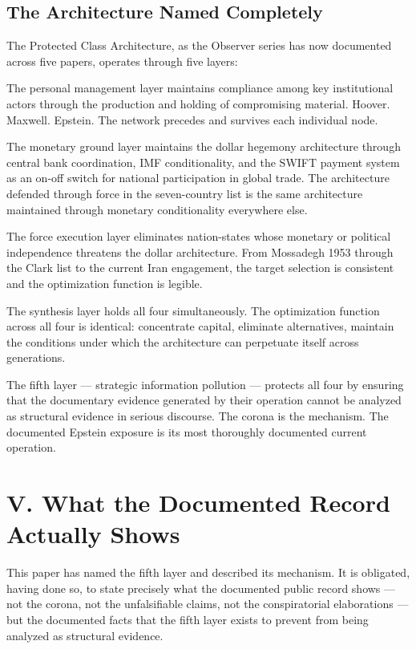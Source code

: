 \documentclass[11pt,a4paper]{article}
\begin{document}
\subsection{The Architecture Named Completely}

The Protected Class Architecture, as the Observer series has now documented across five papers, operates through five layers:


The personal management layer maintains compliance among key institutional actors through the production and holding of compromising material. Hoover. Maxwell. Epstein. The network precedes and survives each individual node.


The monetary ground layer maintains the dollar hegemony architecture through central bank coordination, IMF conditionality, and the SWIFT payment system as an on-off switch for national participation in global trade. The architecture defended through force in the seven-country list is the same architecture maintained through monetary conditionality everywhere else.


The force execution layer eliminates nation-states whose monetary or political independence threatens the dollar architecture. From Mossadegh 1953 through the Clark list to the current Iran engagement, the target selection is consistent and the optimization function is legible.


The synthesis layer holds all four simultaneously. The optimization function across all four is identical: concentrate capital, eliminate alternatives, maintain the conditions under which the architecture can perpetuate itself across generations.


The fifth layer — strategic information pollution — protects all four by ensuring that the documentary evidence generated by their operation cannot be analyzed as structural evidence in serious discourse. The corona is the mechanism. The documented Epstein exposure is its most thoroughly documented current operation.


\section{V. What the Documented Record Actually Shows}

This paper has named the fifth layer and described its mechanism. It is obligated, having done so, to state precisely what the documented public record shows — not the corona, not the unfalsifiable claims, not the conspiratorial elaborations — but the documented facts that the fifth layer exists to prevent from being analyzed as structural evidence.
\end{document}
